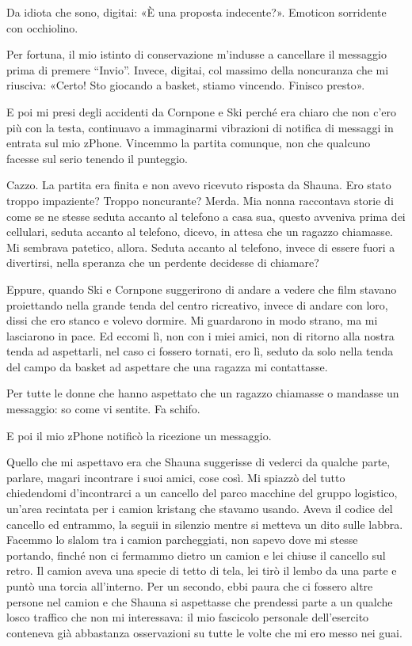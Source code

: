 Da idiota che sono, digitai: «È una proposta indecente?». Emoticon
sorridente con occhiolino.

Per fortuna, il mio istinto di conservazione m'indusse a cancellare il
messaggio prima di premere ``Invio''. Invece, digitai, col massimo della
noncuranza che mi riusciva: «Certo! Sto giocando a basket, stiamo
vincendo. Finisco presto».

E poi mi presi degli accidenti da Cornpone e Ski perché era chiaro che
non c'ero più con la testa, continuavo a immaginarmi vibrazioni di
notifica di messaggi in entrata sul mio zPhone. Vincemmo la partita
comunque, non che qualcuno facesse sul serio tenendo il punteggio.

Cazzo. La partita era finita e non avevo ricevuto risposta da Shauna.
Ero stato troppo impaziente? Troppo noncurante? Merda. Mia nonna
raccontava storie di come se ne stesse seduta accanto al telefono a casa
sua, questo avveniva prima dei cellulari, seduta accanto al telefono,
dicevo, in attesa che un ragazzo chiamasse. Mi sembrava patetico,
allora. Seduta accanto al telefono, invece di essere fuori a divertirsi,
nella speranza che un perdente decidesse di chiamare?

Eppure, quando Ski e Cornpone suggerirono di andare a vedere che film
stavano proiettando nella grande tenda del centro ricreativo, invece di
andare con loro, dissi che ero stanco e volevo dormire. Mi guardarono in
modo strano, ma mi lasciarono in pace. Ed eccomi lì, non con i miei
amici, non di ritorno alla nostra tenda ad aspettarli, nel caso ci
fossero tornati, ero lì, seduto da solo nella tenda del campo da basket
ad aspettare che una ragazza mi contattasse.

Per tutte le donne che hanno aspettato che un ragazzo chiamasse o
mandasse un messaggio: so come vi sentite. Fa schifo.

E poi il mio zPhone notificò la ricezione un messaggio.

\hfill\break

Quello che mi aspettavo era che Shauna suggerisse di vederci da qualche
parte, parlare, magari incontrare i suoi amici, cose così. Mi spiazzò
del tutto chiedendomi d'incontrarci a un cancello del parco macchine del
gruppo logistico, un'area recintata per i camion kristang che stavamo
usando. Aveva il codice del cancello ed entrammo, la seguii in silenzio
mentre si metteva un dito sulle labbra. Facemmo lo slalom tra i camion
parcheggiati, non sapevo dove mi stesse portando, finché non ci fermammo
dietro un camion e lei chiuse il cancello sul retro. Il camion aveva una
specie di tetto di tela, lei tirò il lembo da una parte e puntò una
torcia all'interno. Per un secondo, ebbi paura che ci fossero altre
persone nel camion e che Shauna si aspettasse che prendessi parte a un
qualche losco traffico che non mi interessava: il mio fascicolo
personale dell'esercito conteneva già abbastanza osservazioni su tutte
le volte che mi ero messo nei guai.

